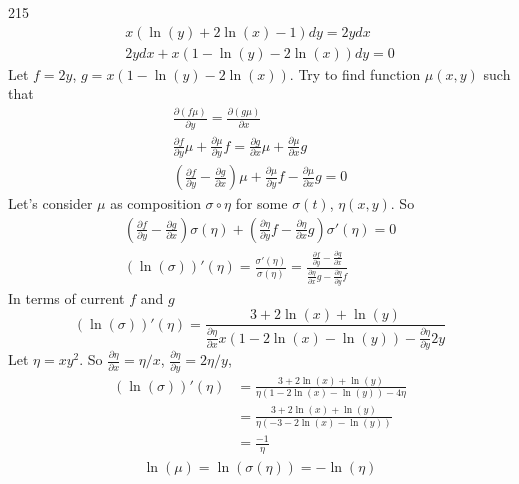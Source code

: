\documentclass[12pt,a4paper]{article}
\begin{document}
    \begin{problem}{215}
        \begin{gather*}
            x(\ln(y) + 2\ln(x) - 1)dy = 2y dx\\
            2y dx + x(1 - \ln(y) - 2\ln(x))dy = 0
        \end{gather*}
        Let $f = 2y$, $g = x(1 - \ln(y) - 2\ln(x))$. Try to find function $\mu(x, y)$ such that
        \begin{gather*}
            \frac{\partial(f\mu)}{\partial y} = \frac{\partial(g\mu)}{\partial x}\\
            \frac{\partial f}{\partial y} \mu + \frac{\partial \mu}{\partial y} f = \frac{\partial g}{\partial x} \mu + \frac{\partial \mu}{\partial x} g\\
            \left(\frac{\partial f}{\partial y} - \frac{\partial g}{\partial x}\right) \mu + \frac{\partial \mu}{\partial y} f - \frac{\partial \mu}{\partial x} g = 0
        \end{gather*}
        Let's consider $\mu$ as composition $\sigma \circ \eta$ for some $\sigma(t)$, $\eta(x, y)$. So
        \begin{gather*}
            \left(\frac{\partial f}{\partial y} - \frac{\partial g}{\partial x}\right) \sigma(\eta) + \left(\frac{\partial \eta}{\partial y} f - \frac{\partial \eta}{\partial x} g\right) \sigma'(\eta) = 0\\
            (\ln(\sigma))'(\eta) = \frac{\sigma'(\eta)}{\sigma(\eta)} = \frac{\frac{\partial f}{\partial y} - \frac{\partial g}{\partial x}}{\frac{\partial \eta}{\partial x} g - \frac{\partial \eta}{\partial y} f}
        \end{gather*}
        In terms of current $f$ and $g$
        \[
            (\ln(\sigma))'(\eta) = \frac{3 + 2\ln(x) + \ln(y)}{\frac{\partial \eta}{\partial x} x(1 - 2\ln(x) - \ln(y)) - \frac{\partial \eta}{\partial y} 2y}
        \]
        Let $\eta = x y^2$. So $\frac{\partial \eta}{\partial x} = \eta/x$, $\frac{\partial \eta}{\partial y} = 2\eta/y$,
        \begin{align*}
            (\ln(\sigma))'(\eta)
            &= \frac{3 + 2\ln(x) + \ln(y)}{\eta(1 - 2\ln(x) - \ln(y)) - 4\eta}\\
            &= \frac{3 + 2\ln(x) + \ln(y)}{\eta(-3 - 2\ln(x) - \ln(y))}\\
            &= \frac{-1}{\eta}
        \end{align*}
        \begin{gather*}
            \ln(\mu) = \ln(\sigma(\eta)) = - \ln(\eta)\\

\end{gather*}
\end{problem}
\end{document}
